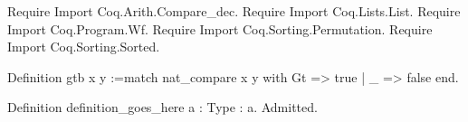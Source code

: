 \documentclass{llncs}
\newif\ifdraft\draftfalse  %
\newcommand{\comment}[3]{\ifdraft\textcolor{#1}{[#2: #3]}\else\fi}
\newcommand{\fixme}[1]{\comment{red}{FIXME}{#1}}
\begin{document}
% 


\begin{coq_eval}
Require Import Coq.Arith.Compare_dec.
Require Import Coq.Lists.List.
Require Import Coq.Program.Wf.
Require Import Coq.Sorting.Permutation.
Require Import Coq.Sorting.Sorted.

Definition gtb x y :=match nat_compare x y with Gt => true | _ => false end.

Definition definition_goes_here {a : Type} : a. Admitted.
\end{coq_eval}

% 
% 
% 
\end{document}
